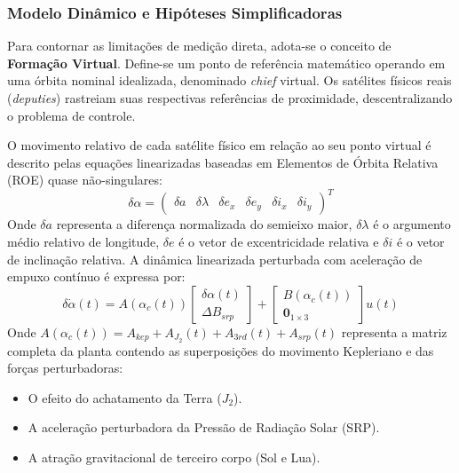 \documentclass[a4paper, 12pt]{article}%
\begin{document}
\subsubsection*{Modelo Dinâmico e Hipóteses Simplificadoras}

Para contornar as limitações de medição direta, adota-se o conceito de \textbf{Formação Virtual}. Define-se um ponto de referência matemático operando em uma órbita nominal idealizada, denominado \textit{chief} virtual. Os satélites físicos reais (\textit{deputies}) rastreiam suas respectivas referências de proximidade, descentralizando o problema de controle.

O movimento relativo de cada satélite físico em relação ao seu ponto virtual é descrito pelas equações linearizadas baseadas em Elementos de Órbita Relativa (ROE) quase não-singulares:
\begin{equation}
    \delta\alpha = \begin{pmatrix} \delta a & \delta\lambda & \delta e_x & \delta e_y & \delta i_x & \delta i_y \end{pmatrix}^T
\end{equation}
Onde $\delta a$ representa a diferença normalizada do semieixo maior, $\delta\lambda$ é o argumento médio relativo de longitude, $\delta e$ é o vetor de excentricidade relativa e $\delta i$ é o vetor de inclinação relativa. A dinâmica linearizada perturbada com aceleração de empuxo contínuo é expressa por:
\begin{equation}
    \delta\dot{\alpha}(t) = A(\alpha_c(t)) \begin{bmatrix} \delta\alpha(t) \\ \Delta B_{srp} \end{bmatrix} + \begin{bmatrix} B(\alpha_c(t)) \\ \mathbf{0}_{1 \times 3} \end{bmatrix} u(t)
\end{equation}
Onde $A(\alpha_c(t)) = A_{kep} + A_{J_2}(t) + A_{3rd}(t) + A_{srp}(t)$ representa a matriz completa da planta contendo as superposições do movimento Kepleriano e das forças perturbadoras:
\begin{itemize}
    \item O efeito do achatamento da Terra ($J_2$).
    \item A aceleração perturbadora da Pressão de Radiação Solar (SRP).
    \item A atração gravitacional de terceiro corpo (Sol e Lua).
\end{itemize}
\end{document}
